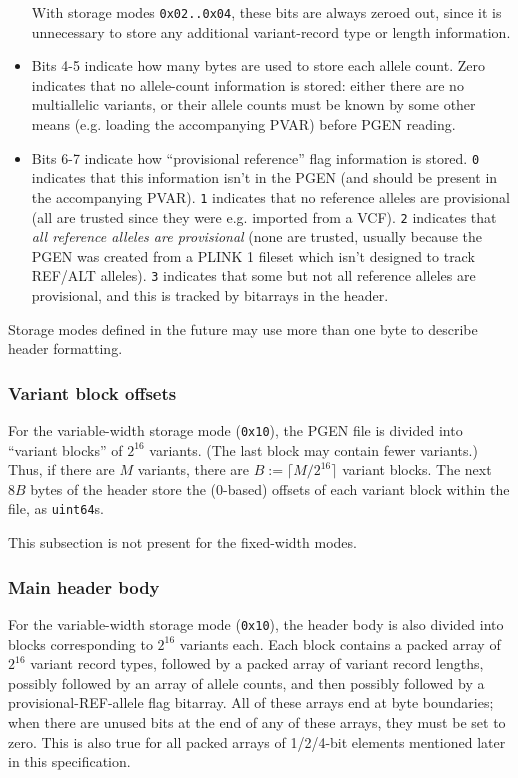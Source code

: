 \documentclass[8pt]{article}
\begin{document}
\begin{itemize}
  With storage modes \texttt{0x02..0x04}, these bits are always zeroed out,
  since it is unnecessary to store any additional variant-record type or length
  information.
  \item Bits 4-5 indicate how many bytes are used to store each allele count.
    Zero indicates that no allele-count information is stored: either there are
    no multiallelic variants, or their allele counts must be known by some
    other means (e.g. loading the accompanying PVAR) before PGEN reading.
  \item Bits 6-7 indicate how ``provisional reference'' flag information is
    stored.  \texttt{0} indicates that this information isn't in the PGEN (and
    should be present in the accompanying PVAR).  \texttt{1} indicates that
    no reference alleles are provisional (all are trusted since they were e.g.
    imported from a VCF).  \texttt{2} indicates that \textit{all reference
    alleles are provisional} (none are trusted, usually because the PGEN was
    created from a PLINK 1 fileset which isn't designed to track REF/ALT
    alleles).  \texttt{3} indicates that some but not all reference alleles are
    provisional, and this is tracked by bitarrays in the header.
\end{itemize}

Storage modes defined in the future may use more than one byte to describe
header formatting.

\subsubsection{Variant block offsets}

For the variable-width storage mode (\texttt{0x10}), the PGEN file is divided
into ``variant blocks'' of $2^{16}$ variants.  (The last block may contain
fewer variants.) Thus, if there are $M$ variants, there are
$B := \lceil M/2^{16}\rceil$ variant blocks.  The next $8B$ bytes of the header
store the (0-based) offsets of each variant block within the file, as
\texttt{uint64}s.

This subsection is not present for the fixed-width modes.

\subsubsection{Main header body}

For the variable-width storage mode (\texttt{0x10}), the header body is also
divided into blocks corresponding to $2^{16}$ variants each.  Each block
contains a packed array of $2^{16}$ variant record types, followed by a packed
array of variant record lengths, possibly followed by an array of allele
counts, and then possibly followed by a provisional-REF-allele flag bitarray.
All of these arrays end at byte boundaries; when there are unused bits at the
end of any of these arrays, they must be set to zero.  This is also true for
all packed arrays of 1/2/4-bit elements mentioned later in this specification.
\end{document}
